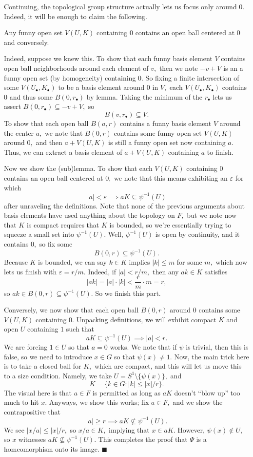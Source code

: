 Continuing, the topological group structure actually lets us focus only around $0.$ Indeed, it will be enough to claim the following.
\begin{lemma}
    Any funny open set $V(U,K)$ containing $0$ contains an open ball centered at $0$ and conversely.
\end{lemma}
Indeed, suppose we knew this. To show that each funny basis element $V$ contains open ball neighborhoods around each element of $v,$ then we note $-v+V$ is an a funny open set (by homogeneity) containing $0.$ So fixing a finite intersection of some $V(U_\bullet,K_\bullet)$ to be a basis element around $0$ in $V,$ each $V(U_\bullet,K_\bullet)$ contains $0$ and thus some $B(0,r_\bullet)$ by lemma. Taking the minimum of the $r_\bullet$ lets us assert $B(0,r_\bullet)\subseteq-v+V,$ so
\[B(v,r_\bullet)\subseteq V.\]
To show that each open ball $B(a,r)$ contains a funny basis element $V$ around the center $a,$ we note that $B(0,r)$ contains some funny open set $V(U,K)$ around $0,$ and then $a+V(U,K)$ is still a funny open set now containing $a.$ Thus, we can extract a basis element of $a+V(U,K)$ containing $a$ to finish.

Now we show the (sub)lemma. To show that each $V(U,K)$ containing $0$ contains an open ball centered at $0,$ we note that this means exhibiting an $\varepsilon$ for which
\[|a|<\varepsilon\implies aK\subseteq\psi^{-1}(U)\]
after unraveling the definitions. Note that none of the previous arguments about basis elements have used anything about the topology on $F,$ but we note now that $K$ is compact requires that $K$ is bounded, so we're essentially trying to squeeze a small set into $\psi^{-1}(U).$ Well, $\psi^{-1}(U)$ is open by continuity, and it contains $0,$ so fix some
\[B(0,r)\subseteq\psi^{-1}(U).\]
Because $K$ is bounded, we can say $k\in K$ implies $|k|\le m$ for some $m,$ which now lets us finish with $\varepsilon=r/m.$ Indeed, if $|a|<r/m,$ then any $ak\in K$ satisfies
\[|ak|=|a|\cdot|k|<\frac rm\cdot m=r,\]
so $ak\in B(0,r)\subseteq\psi^{-1}(U).$ So we finish this part.

Conversely, we now show that each open ball $B(0,r)$ around $0$ contains some $V(U,K)$ containing $0.$ Unpacking definitions, we will exhibit compact $K$ and open $U$ containing $1$ such that
\[aK\subseteq\psi^{-1}(U)\implies|a|<r.\]
We are forcing $1\in U$ so that $a=0$ works. We note that if $\psi$ is trivial, then this is false, so we need to introduce $x\in G$ so that $\psi(x)\ne1.$ Now, the main trick here is to take a closed ball for $K,$ which are compact, and this will let us move this to a size condition. Namely, we take $U=S^1\setminus\{\psi(x)\},$ and
\[K=\{k\in G:|k|\le|x|/r\}.\]
The visual here is that $a\in F$ is permitted as long as $aK$ doesn't ``blow up'' too much to hit $x.$ Anyways, we show this works; fix $a\in F,$ and we show the contrapositive that
\[|a|\ge r\implies aK\not\subseteq\psi^{-1}(U).\]
We see $|x/a|\le|x|/r,$ so $x/a\in K,$ implying that $x\in aK.$ However, $\psi(x)\not\in U,$ so $x$ witnesses $aK\not\subseteq\psi^{-1}(U).$ This completes the proof that $\Psi$ is a homeomorphism onto its image. $\blacksquare$

